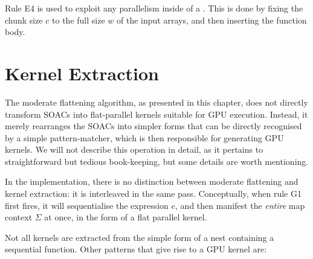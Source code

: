 Rule E4 is used to exploit any parallelism inside of a \StreamSeq{}.
This is done by fixing the chunk size $c$ to the full size $w$ of the
input arrays, and then inserting the function body.

\section{Kernel Extraction}

The moderate flattening algorithm, as presented in this chapter, does
not directly transform SOACs into flat-parallel kernels suitable for
GPU execution.  Instead, it merely rearranges the SOACs into simpler
forms that can be directly recognised by a simple pattern-matcher,
which is then responsible for generating GPU kernels.  We will not
describe this operation in detail, as it pertains to straightforward
but tedious book-keeping, but some details are worth mentioning.

In the implementation, there is no distinction between moderate
flattening and kernel extraction: it is interleaved in the same pass.
Conceptually, when rule G1 first fires, it will sequentialise the
expression $e$, and then manifest the \textit{entire} map context
$\Sigma$ at once, in the form of a flat parallel kernel.

Not all kernels are extracted from the simple form of a  nest
containing a sequential function.  Other patterns that give rise to a
GPU kernel are:



